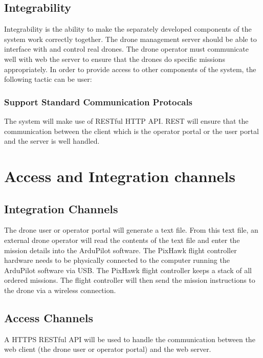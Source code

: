 \documentclass{article}
\begin{document}
	\subsection{Integrability}
	Integrability is the ability to make the separately developed components of the system work correctly together. The drone management server should be able to interface with and control real drones. The drone operator must communicate well with web the server to ensure that the drones do specific missions appropriately. In order to provide access to other components of the system, the following tactic can be user:
	
	\subsubsection{Support Standard Communication Protocals}
	The system will make use of RESTful HTTP API.
	REST will ensure that the communication between the client which is the operator portal or the user portal and the server is well handled.
	
	\section{Access and Integration channels}%
	\subsection{Integration Channels}
	The drone user or operator portal will generate a text file. From this text file, an external drone operator will read the contents of the text file and enter the mission details into the ArduPilot software. The PixHawk flight controller hardware needs to be physically connected to the computer running the ArduPilot software via USB. The PixHawk flight controller keeps a stack of all ordered missions. The flight controller will then send the mission instructions to the drone via a wireless connection.
	\subsection{Access Channels}
	A HTTPS RESTful API will be used to handle the communication between the web client (the drone user or operator portal) and the web server. 
	
\end{document}
